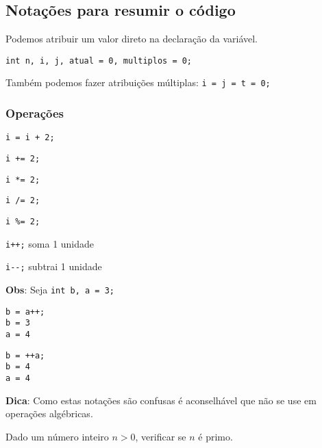 \documentclass[a4paper]{memoir}
\begin{document}
\subsection*{Notações para resumir o código}

Podemos atribuir um valor direto na declaração da variável.

\verb|int n, i, j, atual = 0, multiplos = 0;|

Também podemos fazer atribuições múltiplas: \verb|i = j = t = 0;|

\subsubsection*{Operações}

\verb|i = i + 2;|

\verb|i += 2;|

\verb|i *= 2;|

\verb|i /= 2;|

\verb|i %= 2;|

\verb|i++;| soma 1 unidade

\verb|i--;| subtrai 1 unidade

\newpage

\textbf{Obs}: Seja \verb|int b, a = 3;|

\begin{minipage}[t]{.45\textwidth}
\begin{verbatim}
b = a++;
b = 3
a = 4
\end{verbatim}
\end{minipage}
\begin{minipage}[t]{.45\textwidth}
\begin{verbatim}
b = ++a;
b = 4
a = 4
\end{verbatim}
\end{minipage}

\textbf{Dica}: Como estas notações são confusas é aconselhável que não se use em operações algébricas.

\begin{prob}\label{prob111.cpp}
Dado um número inteiro $n > 0$, verificar se $n$ é primo.
\end{prob}
\end{document}
